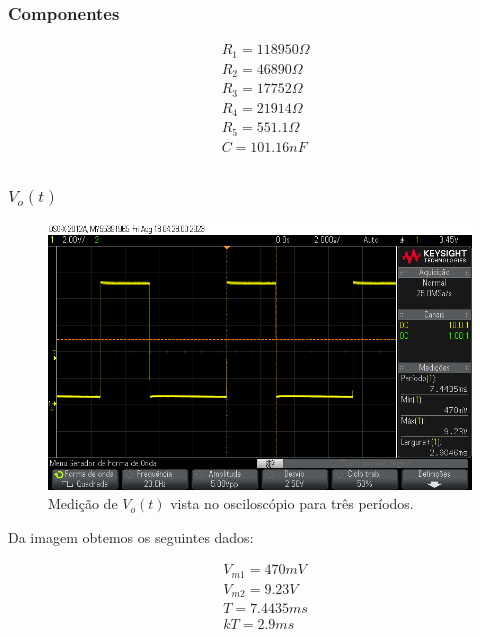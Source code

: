 \subsubsection{Componentes}

\begin{equation}
    \begin{aligned}
         & R_1 = 118950 \varOmega \\
         & R_2 = 46890 \varOmega  \\
         & R_3 = 17752 \varOmega  \\
         & R_4 = 21914 \varOmega  \\
         & R_5 = 551.1 \varOmega  \\
         & C = 101.16nF           \\
    \end{aligned}
\end{equation}


\subsubsection{$V_o (t)$}

\begin{figure}[h]
    \centering
    \includegraphics[width=0.7\columnwidth]{images/ex2_vo.png}
    \caption{Medição de $V_o(t)$ vista no osciloscópio para três períodos.}
\end{figure}

Da imagem obtemos os seguintes dados:

\begin{equation}
    \begin{aligned}
         & V_{m1} = 470mV \\
         & V_{m2} = 9.23V \\
         & T = 7.4435ms   \\
         & kT =  2.9ms    \\
    \end{aligned}
\end{equation}


